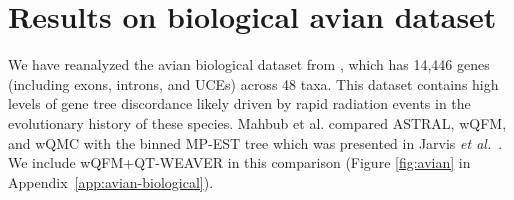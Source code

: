\documentclass[runningheads]{llncs}
\begin{document}




\vspace{-10pt}
\section{Results on biological avian dataset}

We have reanalyzed the avian biological dataset from \cite{jarvis2014}, which has 14,446 genes (including exons, introns, and UCEs) across 48 taxa. This dataset contains high levels of gene tree discordance likely driven by rapid radiation events in the evolutionary history of these species. Mahbub et al. \cite{wqfm} compared ASTRAL, wQFM, and wQMC with the binned MP-EST tree which was presented in Jarvis \textit{et al.}~\cite{jarvis2014}. We include wQFM+QT-WEAVER in this comparison (Figure \ref{fig:avian} in Appendix~\ref{app:avian-biological}). %

\end{document}
